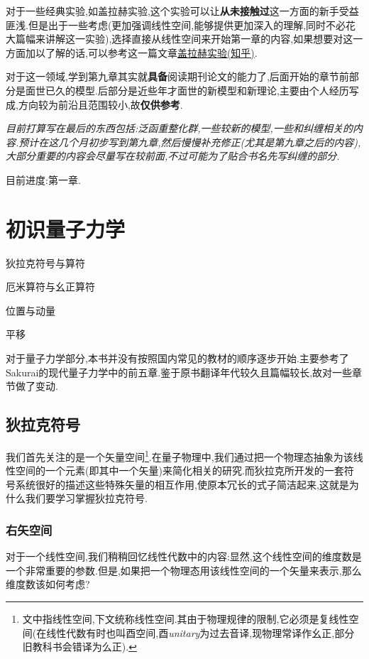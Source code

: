 \documentclass[lang=cn,newtx,10pt,scheme=chinese,thmcnt=section]{elegantbook}
\begin{document}
对于一些经典实验,如盖拉赫实验,这个实验可以让\textbf{从未接触过}这一方面的新手受益匪浅.但是出于一些考虑(更加强调线性空间,能够提供更加深入的理解,同时不必花大篇幅来讲解这一实验),选择直接从线性空间来开始第一章的内容,如果想要对这一方面加以了解的话,可以参考这一篇文章\href{https://zhuanlan.zhihu.com/p/596869364}{盖拉赫实验(知乎)}.

对于这一领域,学到第九章其实就\textbf{具备}阅读期刊论文的能力了,后面开始的章节前部分是面世已久的模型.后部分是近些年才面世的新模型和新理论,主要由个人经历写成,方向较为前沿且范围较小,故\textbf{仅供参考}.

\textit{目前打算写在最后的东西包括:泛函重整化群,一些较新的模型,一些和纠缠相关的内容.预计在这几个月初步写到第九章,然后慢慢补充修正(尤其是第九章之后的内容),大部分重要的内容会尽量写在较前面,不过可能为了贴合书名先写纠缠的部分.}

目前进度:第一章.


\chapter{初识量子力学}
\begin{introduction}
	\item 狄拉克符号与算符
	\item 厄米算符与幺正算符
	\item 位置与动量
	\item 平移
\end{introduction}
对于量子力学部分,本书并没有按照国内常见的教材的顺序逐步开始.主要参考了Sakurai的现代量子力学中的前五章.鉴于原书翻译年代较久且篇幅较长,故对一些章节做了变动.
\section{狄拉克符号}
我们首先关注的是一个矢量空间\footnote{文中指线性空间,下文统称线性空间.其由于物理规律的限制,它必须是复线性空间(在线性代数有时也叫酉空间,酉\textit{unitary}为过去音译,现物理常译作幺正,部分旧教科书会错译为么正).}.在量子物理中,我们通过把一个物理态抽象为该线性空间的一个元素(即其中一个矢量)来简化相关的研究.而狄拉克所开发的一套符号系统很好的描述这些特殊矢量的相互作用,使原本冗长的式子简洁起来,这就是为什么我们要学习掌握狄拉克符号.
\subsection*{右矢空间}
对于一个线性空间,我们稍稍回忆线性代数中的内容:显然,这个线性空间的维度数是一个非常重要的参数.但是,如果把一个物理态用该线性空间的一个矢量来表示,那么维度数该如何考虑?
\end{document}
